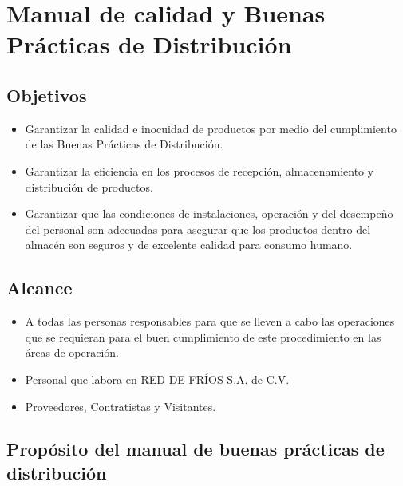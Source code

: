 \renewcommand{\Codigo}{BPD-PROG}
\renewcommand{\FechaPub}{2023-01}
\renewcommand{\Edit}{03}
\renewcommand{\Titulo}{Manual de calidad y Buenas Prácticas de Distribución}

\section{\Titulo}

\subsection{Objetivos}

\begin{itemize}
	\item Garantizar la calidad e inocuidad de productos por medio del cumplimiento de las Buenas Prácticas de Distribución.
	\item Garantizar la eficiencia en los procesos de recepción, almacenamiento y distribución de productos.
	\item Garantizar que las condiciones de instalaciones, operación y del desempeño del personal son adecuadas para asegurar que los productos dentro del almacén son seguros y de excelente calidad para consumo humano.
\end{itemize}

\subsection{Alcance}

\begin{itemize}
	\item A todas las personas responsables para que se lleven a cabo las operaciones que se requieran para el buen cumplimiento de este procedimiento en las áreas de operación.
	\item Personal que labora en RED DE FRÍOS S.A. de C.V.
	\item Proveedores, Contratistas y Visitantes.
\end{itemize}

\subsection{Propósito del manual de buenas prácticas de distribución}

